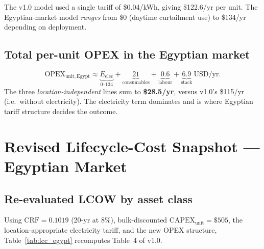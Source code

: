 \documentclass[11pt,a4paper]{article}
\begin{document}
The v1.0 model used a single tariff of \$0.04/kWh, giving \$122.6/yr per unit. The Egyptian-market model \emph{ranges} from \$0 (daytime curtailment use) to \$134/yr depending on deployment.

\subsection{Total per-unit OPEX in the Egyptian market}
\begin{equation}
\mathrm{OPEX}_{\mathrm{unit,Egypt}} \approx \underbrace{E_{\mathrm{elec}}}_{\text{0--134}} + \underbrace{21}_{\text{consumables}} + \underbrace{0.6}_{\text{labour}} + \underbrace{6.9}_{\text{stack}}\ \mathrm{USD/yr}.
\end{equation}
The three \emph{location-independent} lines sum to \textbf{\$28.5/yr}, versus v1.0's \$115/yr (i.e.\ without electricity). The electricity term dominates and is where Egyptian tariff structure decides the outcome.

\section{Revised Lifecycle-Cost Snapshot --- Egyptian Market}
\label{sec:revised_lcc}

\subsection{Re-evaluated LCOW by asset class}
Using $\mathrm{CRF}=0.1019$ (20-yr at 8\%), bulk-discounted $\mathrm{CAPEX}_{\mathrm{unit}}=\$505$, the location-appropriate electricity tariff, and the new OPEX structure, Table~\ref{tab:lcc_egypt} recomputes Table~4 of v1.0.
\end{document}
